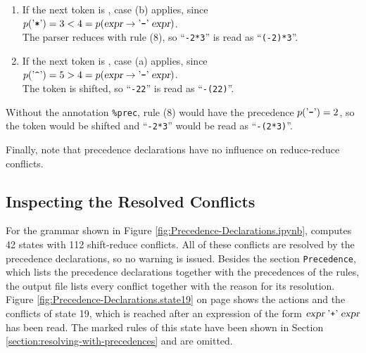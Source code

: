 \begin{enumerate}
\item If the next token is \saquoted{*}, case (b) applies, since
      \\[0.2cm]
      \hspace*{1.3cm}
      $p(\mbox{'\texttt{*}'}) = 3 < 4 = p(\textsl{expr} \rightarrow \mbox{'\texttt{-}'}\; \textsl{expr})$.
      \\[0.2cm]
      The parser
      reduces with rule (8), so ``\texttt{-2*3}'' is read as ``\texttt{(-2)*3}''.
\item If the next token is , case (a) applies, since
      \\[0.2cm]
      \hspace*{1.3cm}
      $p(\saquoted{\symbol{94}}) = 5 > 4 = p(\textsl{expr} \rightarrow \saquoted{-}\; \textsl{expr})$.
      \\[0.2cm]
      The token is shifted, so ``\texttt{-22}'' is read as
      ``\texttt{-(22)}''.
\end{enumerate}
Without the annotation \texttt{\%prec}, rule (8) would have the precedence $p(\mbox{'\texttt{-}'}) = 2$, so the token
\saquoted{*} would be shifted and ``\texttt{-2*3}'' would be read as ``\texttt{-(2*3)}''.

Finally, note that precedence declarations have no influence on reduce-reduce conflicts.

\subsection{Inspecting the Resolved Conflicts}
For the grammar shown in Figure \ref{fig:Precedence-Declarations.ipynb},  computes 42 states
with 112 shift-reduce conflicts.  All of these conflicts are resolved by the precedence declarations, so no
warning is issued.  Besides the section \texttt{Precedence}, which lists the precedence declarations together with
the precedences of the rules, the output file lists every conflict together with the reason for its resolution.
Figure \ref{fig:Precedence-Declarations.state19} on page
\pageref{fig:Precedence-Declarations.state19} shows the actions and the conflicts of state 19, which is reached
after an expression of the form $\textsl{expr} \;\mbox{'\texttt{+}'}\; \textsl{expr}$ has been read.  The marked rules of this
state have been shown in Section \ref{section:resolving-with-precedences} and are omitted.


